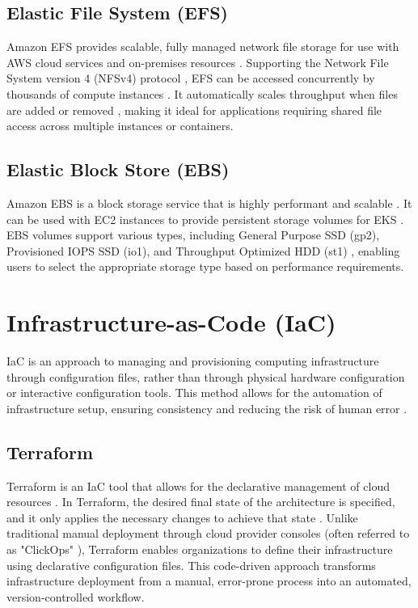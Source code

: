 \subsection{Elastic File System (EFS)}
Amazon EFS provides scalable, fully managed network file storage for use with AWS cloud services and on-premises resources \cite{efs_definition}. Supporting the Network File System version 4 (NFSv4) protocol \cite{efs_work}, EFS can be accessed concurrently by thousands of compute instances \cite{efs_performance}. It automatically scales throughput when files are added or removed \cite{efs_performance}, making it ideal for applications requiring shared file access across multiple instances or containers.

\subsection{Elastic Block Store (EBS)}
Amazon EBS is a block storage service that is highly performant and scalable \cite{ebs_definition}. It can be used with EC2 instances to provide persistent storage volumes for EKS \cite{ebs_with_eks}. EBS volumes support various types, including General Purpose SSD (gp2), Provisioned IOPS SSD (io1), and Throughput Optimized HDD (st1) \cite{ebs_types}, enabling users to select the appropriate storage type based on performance requirements.

\section{Infrastructure-as-Code (IaC)}
IaC is an approach to managing and provisioning computing infrastructure through configuration files, rather than through physical hardware configuration or interactive configuration tools. This method allows for the automation of infrastructure setup, ensuring consistency and reducing the risk of human error \cite{iac_benefits}.

\subsection{Terraform}
Terraform is an IaC tool that allows for the declarative management of cloud resources \cite{terraform_hashicorp}. In Terraform, the desired final state of the architecture is specified, and it only applies the necessary changes to achieve that state \cite{terraform_declarative}. Unlike traditional manual deployment through cloud provider consoles (often referred to as "ClickOps" \cite{clickops}), Terraform enables organizations to define their infrastructure using declarative configuration files. This code-driven approach transforms infrastructure deployment from a manual, error-prone process into an automated, version-controlled workflow.

